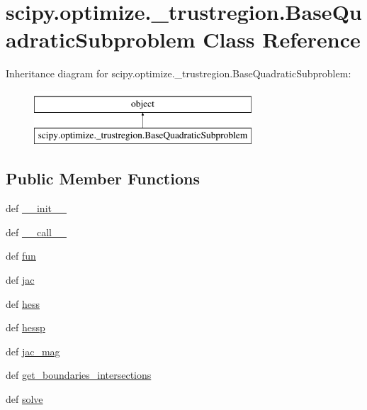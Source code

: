 \hypertarget{classscipy_1_1optimize_1_1__trustregion_1_1BaseQuadraticSubproblem}{}\section{scipy.\+optimize.\+\_\+trustregion.\+Base\+Quadratic\+Subproblem Class Reference}
\label{classscipy_1_1optimize_1_1__trustregion_1_1BaseQuadraticSubproblem}
Inheritance diagram for scipy.\+optimize.\+\_\+trustregion.\+Base\+Quadratic\+Subproblem\+:\begin{figure}[H]
\begin{center}
\leavevmode
\includegraphics[height=2.000000cm]{classscipy_1_1optimize_1_1__trustregion_1_1BaseQuadraticSubproblem}
\end{center}
\end{figure}
\subsection*{Public Member Functions}
\begin{DoxyCompactItemize}
\item 
def \hyperlink{classscipy_1_1optimize_1_1__trustregion_1_1BaseQuadraticSubproblem_a9bdf1ac27dba45127a2f6b2b208d9b2f}{\+\_\+\+\_\+init\+\_\+\+\_\+}
\item 
def \hyperlink{classscipy_1_1optimize_1_1__trustregion_1_1BaseQuadraticSubproblem_add95d02a2c888460b7391a57dab86f01}{\+\_\+\+\_\+call\+\_\+\+\_\+}
\item 
def \hyperlink{classscipy_1_1optimize_1_1__trustregion_1_1BaseQuadraticSubproblem_aca0b79d68b2643ed883e87fd9ff7cbb7}{fun}
\item 
def \hyperlink{classscipy_1_1optimize_1_1__trustregion_1_1BaseQuadraticSubproblem_a17596b1be688b5301f8300b4a21df90f}{jac}
\item 
def \hyperlink{classscipy_1_1optimize_1_1__trustregion_1_1BaseQuadraticSubproblem_a7c1692a1218e579bcb1a57ce97aab2fb}{hess}
\item 
def \hyperlink{classscipy_1_1optimize_1_1__trustregion_1_1BaseQuadraticSubproblem_a9d817d92b720b5b6264c715ba4d2e407}{hessp}
\item 
def \hyperlink{classscipy_1_1optimize_1_1__trustregion_1_1BaseQuadraticSubproblem_a644b50132bc0036ec1b8693c0ad272cf}{jac\+\_\+mag}
\item 
def \hyperlink{classscipy_1_1optimize_1_1__trustregion_1_1BaseQuadraticSubproblem_a74444759a8f4df235c7dbb63cfca89b5}{get\+\_\+boundaries\+\_\+intersections}
\item 
def \hyperlink{classscipy_1_1optimize_1_1__trustregion_1_1BaseQuadraticSubproblem_a5b354e359b40b37e49cde2fba4d129cb}{solve}
\end{DoxyCompactItemize}



